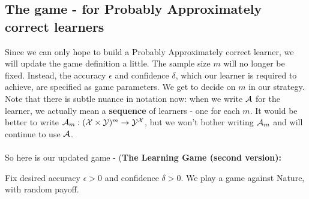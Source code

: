 {%


\subsection{The game - for Probably Approximately correct learners}

Since we can only hope to build a Probably Approximately correct learner, we
will update the game definition a little. The sample size $m$ will no longer be
fixed. Instead, the accuracy $\epsilon$ and confidence $\delta$,  which our
learner is required to achieve, are specified as game parameters. We get to
decide on $m$ in our strategy. Note that there is subtle nuance in notation now:
when we write $\mathcal{A}$ for the learner, we actually mean a {\bf sequence} of
learners - one for each $m$. It would be better to write $\mathcal{A}_m:(\mathcal{X}\times \mathcal{Y})^m
\to \mathcal{Y}^{\mathcal{X}}$, but we won't bother writing $\mathcal{A}_m$ and will continue to use $\mathcal{A}$.
\\~\\
So here is our updated game - (\bf The Learning Game (second version):} Fix desired accuracy $\epsilon>0$ and confidence $\delta>0$. We play a game against Nature, with random payoff.
